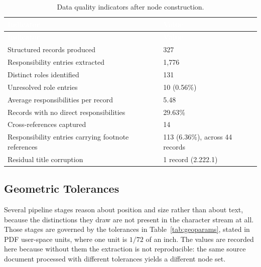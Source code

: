 \begin{longtable}{|p{}|p{}|}
\caption{Data quality indicators after node construction.}\label{tab:quality}\\
\hline
\rowcolor{myblue}\textcolor{white}{\textbf{Indicator}} & \textcolor{white}{\textbf{Value}} \\
\hline
\endfirsthead
\hline
\rowcolor{myblue}\textcolor{white}{\textbf{Indicator}} & \textcolor{white}{\textbf{Value}} \\
\hline
\endhead
Structured records produced & 327 \\ \hline
Responsibility entries extracted & 1,776 \\ \hline
Distinct roles identified & 131 \\ \hline
Unresolved role entries & 10 (0.56\%) \\ \hline
Average responsibilities per record & 5.48 \\ \hline
Records with no direct responsibilities & 29.63\% \\ \hline
Cross-references captured & 14 \\ \hline
Responsibility entries carrying footnote references & 113 (6.36\%), across 44 records \\ \hline
Residual title corruption & 1 record (2.222.1) \\ \hline
\end{longtable}

\subsection{Geometric Tolerances}
\label{sec:geotolerances}

Several pipeline stages reason about position and size rather than about text, because the
distinctions they draw are not present in the character stream at all. Those stages are
governed by the tolerances in Table~\ref{tab:geoparams}, stated in PDF user-space units,
where one unit is $1/72$ of an inch. The values are recorded here because without them the
extraction is not reproducible: the same source document processed with different tolerances
yields a different node set.

